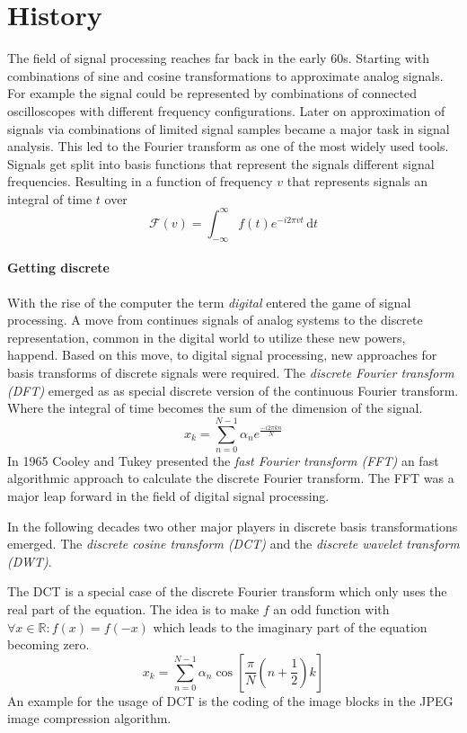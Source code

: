 \section{History}
\label{sec:history}
The field of signal processing reaches far back in the early 60s.
Starting with combinations of sine and cosine transformations to approximate
analog signals. For example the signal could be represented by combinations of
connected oscilloscopes with different frequency configurations. Later on
approximation of signals via combinations of limited signal samples became a
major task in signal analysis.
This led to the Fourier transform as one of the most widely
used tools. Signals get split into basis functions that represent the
signals different signal frequencies. 
Resulting in a function of frequency $v$ that represents signals an integral
of time $t$ over  
\begin{equation*}
\mathcal{F}\left(v\right) = \int_{-\infty}^{\infty} \! f(t)e^{-i2\pi vt} \,
\mathrm{d}t
\end{equation*}

\paragraph{Getting discrete}
With the rise of the computer the term \emph{digital} entered the
game of signal processing. A move from continues signals of analog systems to
the discrete representation, common in the digital world to utilize these new
powers, happend. Based on this move, to digital signal processing, new
approaches for basis transforms of discrete signals were required. The
\emph{discrete Fourier transform (DFT)} emerged as as special discrete version
of the continuous
Fourier transform. Where the integral of time becomes the sum of the dimension
of the signal. 
  \begin{equation*}
 x_k = \sum_{n=0}^{N-1}\alpha_ne^{\frac{-i2\pi kn}{N}}
\end{equation*}
In 1965 Cooley and Tukey presented\cite{Cooley1965} the \emph{fast Fourier
transform (FFT)} an fast algorithmic approach to calculate the discrete
Fourier transform.
The FFT was a major leap forward in the field of digital signal processing.

In the following decades two other major players in discrete basis
transformations emerged. The \emph{discrete cosine transform (DCT)} and the
\emph{discrete wavelet transform (DWT)}. 

The DCT is a special case of the discrete Fourier transform which only uses the
real part of the equation. The idea is to make $f$ an odd function with $\forall
x \in \mathbb{R} : f(x) = f(-x)$ which leads to the imaginary part of the
equation becoming zero.
\begin{equation*}
x_k = \sum_{n=0}^{N-1}\alpha_n\cos \left[ \frac{\pi}{N} \left(
n+\frac{1}{2}\right) k\right]
\end{equation*}
An example for the usage of DCT is the coding of the image blocks in the
JPEG image compression algorithm.

